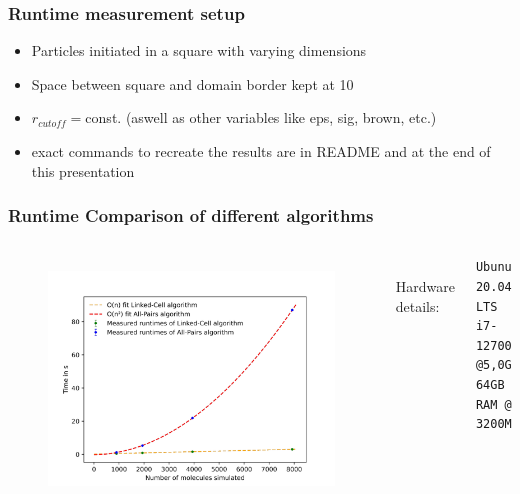 \begin{frame}
	\frametitle{Runtime measurement setup}
	\vspace{2.3cm}
		\large
		\begin{itemize}
			\setlength\itemsep{1em}
			\item<1-> Particles initiated in a square with varying dimensions
			\item<2-> Space between square and domain border kept at 10
			\item<3-> $r_{cutoff} = $const. (aswell as other variables like eps, sig, brown, etc.)
			\item<4-> exact commands to recreate the results are in README and at the end of this presentation
		\end{itemize}
		
\end{frame}


\begin{frame}[fragile]
	\frametitle{Runtime Comparison of different algorithms}
	\begin{columns}
			\vspace{-0.9cm}
			\begin{figure}
				\centering
				\includegraphics[width=\linewidth]{plot}
				\label{fig:plot}
			\end{figure}
		\\
		
		
		\large
		Hardware details:
		\begin{lstlisting}
Ubunutu 20.04 LTS
i7-12700KF @5,0GHz
64GB RAM @ 3200MHz
		\end{lstlisting}
	
	
	\end{columns}
\end{frame}

